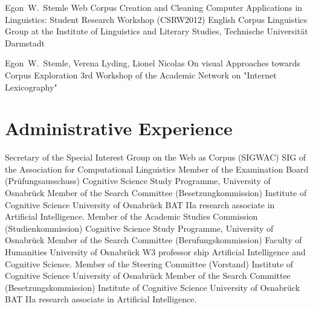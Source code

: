 \documentclass[11pt,a4paper]{moderncv}
\begin{document}
        {Egon~W.~Stemle}
        {Web Corpus Creation and Cleaning}
        {\small Computer Applications in Linguistics: Student Research Workshop (CSRW2012)}
        {\small English Corpus Linguistics Group at the Institute of
        Linguistics and Literary Studies, Technische Universit\"{a}t Darmstadt}
        {}

        {Egon~W.~Stemle, Verena Lyding, Lionel Nicolas}
        {\small On visual Approaches towards Corpus Exploration}
        {\small 3rd Workshop of the Academic Network on "Internet Lexicography"}
        {\small}
        {}

\closesection{}


\section{Administrative Experience}
        {Secretary of the Special Interest Group on the Web as Corpus (SIGWAC)}
        {}
        {SIG of the Association for Computational Linguistics}
        {}
        {}
        {Member of the Examination Board (Pr\"{u}fungsausschuss)}
        {}
        {Cognitive Science Study Programme, University of Osnabr\"{u}ck}
        {}
        {}
        {Member of the Search Committee (Besetzungkommission)}
        {}
        {Institute of Cognitive Science}
        {University of Osnabr\"{u}ck}
        {BAT IIa research associate in Artificial Intelligence.}
        {Member of the Academic Studies Commission (Studienkommission)}
        {}
        {Cognitive Science Study Programme, University of Osnabr\"{u}ck}
        {}
        {}
        {Member of the Search Committee (Berufungskommission)}
        {}
        {Faculty of Humanities}
        {University of Osnabr\"{u}ck}
        {W3 professor ship Artificial Intelligence and Cognitive Science.}
        {Member of the Steering Committee (Vorstand)}
        {}
        {Institute of Cognitive Science}
        {University of Osnabr\"{u}ck}
        {}
        {Member of the Search Committee (Besetzungskommission)}
        {}
        {Institute of Cognitive Science}
        {University of Osnabr\"{u}ck}
        {BAT IIa research associate in Artificial Intelligence.}
\closesection{}
\end{document}
